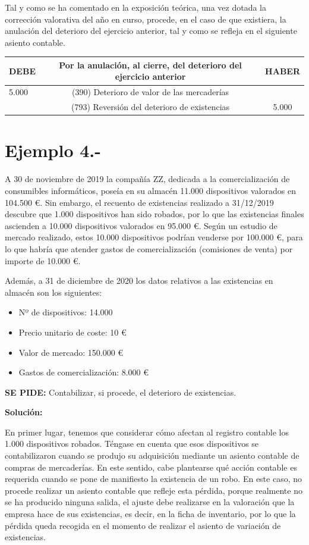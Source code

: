 \documentclass{article}
\begin{document}
Tal y como se ha comentado en la exposición teórica, una vez dotada la corrección valorativa del año en curso, procede, en el caso de que existiera, la anulación del deterioro del ejercicio anterior, tal y como se refleja en el siguiente asiento contable.

\begin{table}[H]
    \centering
    \begin{tabular}{|l|c|c|}
        \hline
        \textbf{DEBE} & \textbf{Por la anulación, al cierre, del deterioro del ejercicio anterior} & \textbf{HABER} \\
        \hline
        5.000 & (390) Deterioro de valor de las mercaderías &  \\
         & (793) Reversión del deterioro de existencias & 5.000 \\
        \hline
    \end{tabular}
\end{table}

\section*{Ejemplo 4.-} A 30 de noviembre de 2019 la compañía ZZ, dedicada a la comercialización de consumibles informáticos, poseía en su almacén 11.000 dispositivos valorados en 104.500 €. Sin embargo, el recuento de existencias realizado a 31/12/2019 descubre que 1.000 dispositivos han sido robados, por lo que las existencias finales ascienden a 10.000 dispositivos valorados en 95.000 €. Según un estudio de mercado realizado, estos 10.000 dispositivos podrían venderse por 100.000 €, para lo que habría que atender gastos de comercialización (comisiones de venta) por importe de 10.000 €.

Además, a 31 de diciembre de 2020 los datos relativos a las existencias en almacén son los siguientes:
\begin{itemize}
    \item Nº de dispositivos: 14.000
    \item Precio unitario de coste: 10 €
    \item Valor de mercado: 150.000 €
    \item Gastos de comercialización: 8.000 €
\end{itemize}

\textbf{SE PIDE:} Contabilizar, si procede, el deterioro de existencias.

\textbf{Solución:}

En primer lugar, tenemos que considerar cómo afectan al registro contable los 1.000 dispositivos robados. Téngase en cuenta que esos dispositivos se contabilizaron cuando se produjo su adquisición mediante un asiento contable de compras de mercaderías. En este sentido, cabe plantearse qué acción contable es requerida cuando se pone de manifiesto la existencia de un robo. En este caso, no procede realizar un asiento contable que refleje esta pérdida, porque realmente no se ha producido ninguna salida, el ajuste debe realizarse en la valoración que la empresa hace de sus existencias, es decir, en la ficha de inventario, por lo que la pérdida queda recogida en el momento de realizar el asiento de variación de existencias.
\end{document}
